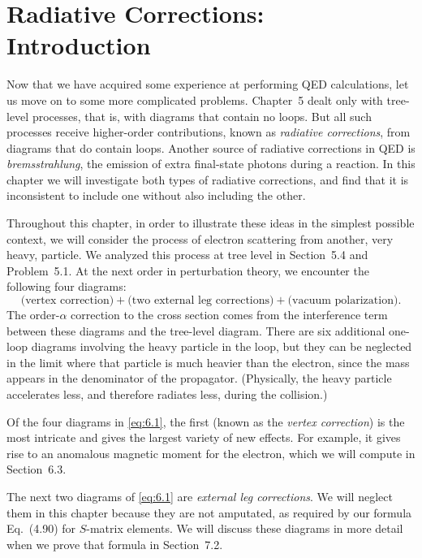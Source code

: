 \chapter{Radiative Corrections: Introduction}

Now that we have acquired some experience at performing QED calculations,
let us move on to some more complicated problems.  Chapter~5 dealt only with
tree-level processes, that is, with diagrams that contain no loops.  But all
such processes receive higher-order contributions, known as \emph{radiative
corrections}, from diagrams that do contain loops.  Another source of
radiative corrections in QED is \emph{bremsstrahlung}, the emission of extra
final-state photons during a reaction.  In this chapter we will investigate
both types of radiative corrections, and find that it is inconsistent to
include one without also including the other.

Throughout this chapter, in order to illustrate these ideas in the simplest
possible context, we will consider the process of electron scattering from
another, very heavy, particle.  We analyzed this process at tree level in
Section~5.4 and Problem~5.1.  At the next order in perturbation theory, we
encounter the following four diagrams:
\begin{equation}
  \text{(vertex correction)} + \text{(two external leg corrections)}
    + \text{(vacuum polarization)} .
  \label{eq:6.1}
\end{equation}
The order-$\alpha$ correction to the cross section comes from the interference
term between these diagrams and the tree-level diagram.  There are six
additional one-loop diagrams involving the heavy particle in the loop, but
they can be neglected in the limit where that particle is much heavier than
the electron, since the mass appears in the denominator of the propagator.
(Physically, the heavy particle accelerates less, and therefore radiates less,
during the collision.)

Of the four diagrams in \eqref{eq:6.1}, the first (known as the
\emph{vertex correction}) is the most intricate and gives the largest variety
of new effects.  For example, it gives rise to an anomalous magnetic moment
for the electron, which we will compute in Section~6.3.

The next two diagrams of \eqref{eq:6.1} are \emph{external leg corrections}.
We will neglect them in this chapter because they are not amputated, as
required by our formula Eq.~(4.90) for $S$-matrix elements.  We will
discuss these diagrams in more detail when we prove that formula in
Section~7.2.

